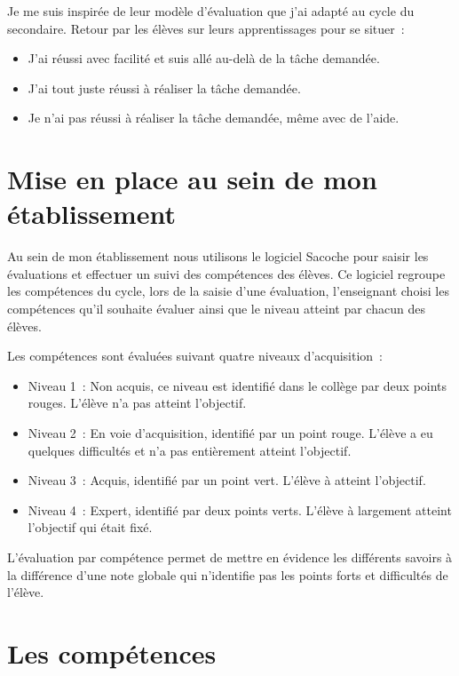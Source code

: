 Je me suis inspirée de leur modèle d'évaluation que j'ai adapté au cycle du secondaire.
Retour par les élèves sur leurs apprentissages pour se situer~:
\begin{itemize}
\item J'ai réussi avec facilité et suis allé au-delà de la tâche demandée. 
\item J'ai tout juste réussi à réaliser la tâche demandée.
\item Je n'ai pas réussi à réaliser la tâche demandée, même avec de l'aide.
\end{itemize} 



\section{Mise en place au sein de mon établissement}

Au sein de mon établissement nous utilisons le logiciel Sacoche pour saisir les évaluations et effectuer un suivi des compétences des élèves.
Ce logiciel regroupe les compétences du cycle, lors de la saisie d'une évaluation, l'enseignant choisi les compétences qu'il souhaite évaluer ainsi que le niveau atteint par chacun des élèves.

Les compétences sont évaluées suivant quatre niveaux d'acquisition~:
\begin{itemize}
\item Niveau 1~: Non acquis, ce niveau est identifié dans le collège par deux points rouges. L'élève n'a pas atteint l'objectif.
\item Niveau 2~: En voie d'acquisition, identifié par un point rouge. L'élève a eu quelques difficultés et n'a pas entièrement atteint l'objectif.
\item Niveau 3~: Acquis, identifié par un point vert. L'élève à atteint l'objectif.
\item Niveau 4~: Expert, identifié par deux points verts. L'élève à largement atteint l'objectif qui était fixé.
\end{itemize}

L'évaluation par compétence permet de mettre en évidence les différents savoirs à la différence d'une note globale qui n'identifie pas les points forts et difficultés de l'élève.


\section{Les compétences}

